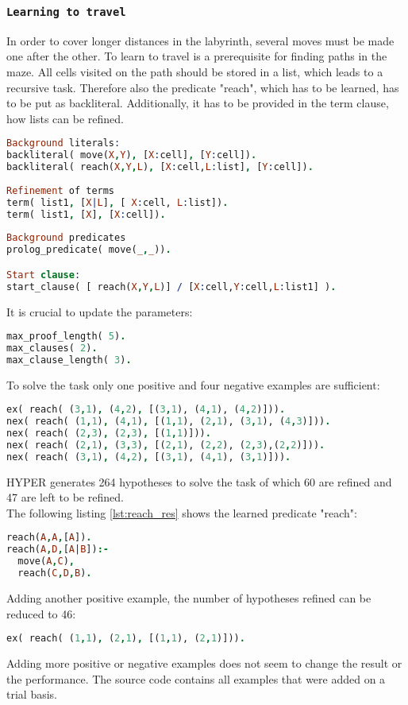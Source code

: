 \subsubsection{\texttt{Learning to travel}}
In order to cover longer distances in the labyrinth, several moves must be made one after the other.
To learn to travel is a prerequisite for finding paths in the maze. All cells visited on the path should be stored in a list, which leads to a recursive task.
Therefore also the predicate "reach", which has to be learned, has to be put as backliteral.
Additionally, it has to be provided in the term clause, how lists can be refined.
\begin{lstlisting}[label={lst:travel}, language=Prolog, caption=Learning the predicate "move", belowcaptionskip=1cm]
Background literals:
backliteral( move(X,Y), [X:cell], [Y:cell]).
backliteral( reach(X,Y,L), [X:cell,L:list], [Y:cell]).
 
Refinement of terms
term( list1, [X|L], [ X:cell, L:list]).
term( list1, [X], [X:cell]).
	
Background predicates
prolog_predicate( move(_,_)).

Start clause:
start_clause( [ reach(X,Y,L)] / [X:cell,Y:cell,L:list1] ).    
\end{lstlisting}
It is crucial to update the parameters:
\begin{lstlisting}[label={lst:reach_params}, language=Prolog, caption=Parameters for learning "reach", belowcaptionskip=1cm]
max_proof_length( 5).   
max_clauses( 2).        
max_clause_length( 3).  
\end{lstlisting}
To solve the task only one positive and four negative examples are sufficient:
\begin{lstlisting}[label={lst:reach_examples}, language=Prolog, caption= Examples for "reach", belowcaptionskip=1cm]
ex( reach( (3,1), (4,2), [(3,1), (4,1), (4,2)])).
nex( reach( (1,1), (4,1), [(1,1), (2,1), (3,1), (4,3)])).
nex( reach( (2,3), (2,3), [(1,1)])).
nex( reach( (2,1), (3,3), [(2,1), (2,2), (2,3),(2,2)])).
nex( reach( (3,1), (4,2), [(3,1), (4,1), (3,1)])).
\end{lstlisting}
HYPER generates 264 hypotheses to solve the task of which 60 are refined and 47 are left to be refined.\\
The following listing \ref{lst:reach_res} shows the learned predicate "reach":
\begin{lstlisting}[label={lst:reach_res}, language=Prolog, caption= Predicate "reach", belowcaptionskip=1cm]
reach(A,A,[A]).
reach(A,D,[A|B]):-
  move(A,C),
  reach(C,D,B).
\end{lstlisting}
Adding another positive example, the number of hypotheses refined can be reduced to 46:
\begin{lstlisting}[label={lst:reach_ex1}, language=Prolog, caption= Additional positive example for "reach", belowcaptionskip=1cm]
ex( reach( (1,1), (2,1), [(1,1), (2,1)])).
\end{lstlisting}
Adding more positive or negative examples does not seem to change the result or the performance. The source code contains all examples that were added on a trial basis.
